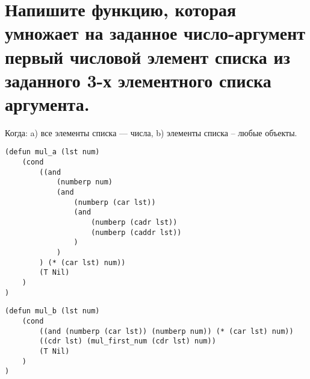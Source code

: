 \documentclass[a4paper, 14pt, unknownkeysallowed]{extreport}
\begin{document}
\section{Напишите функцию, которая умножает на заданное число-аргумент 
первый числовой элемент списка из заданного 3-х элементного списка аргумента.}
Когда:
a) все элементы списка --- числа,
b) элементы списка -- любые объекты.

\begin{lstlisting}
(defun mul_a (lst num)
	(cond
		((and
			(numberp num)
			(and
				(numberp (car lst))
				(and
					(numberp (cadr lst))
					(numberp (caddr lst))
				)
			)
		) (* (car lst) num))
		(T Nil)
	)
)
\end{lstlisting}


\begin{lstlisting}
(defun mul_b (lst num)
	(cond
		((and (numberp (car lst)) (numberp num)) (* (car lst) num))
		((cdr lst) (mul_first_num (cdr lst) num))
		(T Nil)
	)
)
\end{lstlisting}
\end{document}
